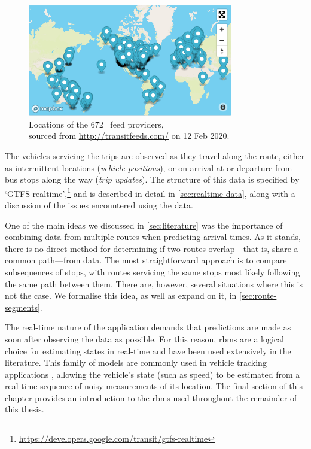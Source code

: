 \begin{figure}
\centering
\includegraphics[width=0.8\textwidth]{figure/gtfs_feeds.png}
\caption[Locations of GTFS feed providers]{Locations of the 672~\GTFS{} feed providers,\\
sourced from \url{http://transitfeeds.com/} on 12 Feb 2020.}
\label{fig:gtfs_feeds}
\end{figure}


The vehicles servicing the trips are observed as they travel along the route, either as intermittent \GPS{} locations (\emph{vehicle positions}), or on arrival at or departure from bus stops along the way (\emph{trip updates}). The structure of this data is specified by `GTFS-realtime',\footnote{\url{https://developers.google.com/transit/gtfs-realtime}} and is described in detail in \cref{sec:realtime-data}, along with a discussion of the issues encountered using the \AT{} data.


One of the main ideas we discussed in \cref{sec:literature} was the importance of combining data from multiple routes when predicting arrival times. As it stands, there is no direct method for determining if two routes overlap---that is, share a common path---from \GTFS{} data. The most straightforward approach is to compare subsequences of stops, with routes servicing the same stops most likely following the same path between them. There are, however, several situations where this is not the case. We formalise this idea, as well as expand on it, in \cref{sec:route-segments}.


The real-time nature of the application demands that predictions are made as soon after observing the data as possible. For this reason, \glspl{rbm} are a logical choice for estimating states in real-time and have been used extensively in the literature. This family of models are commonly used in vehicle tracking applications \citep{Zhao_1997,Mutambara_2000,Carpenter_1999,Wall_1999}, allowing the vehicle's state (such as speed) to be estimated from a real-time sequence of noisy measurements of its location. The final section of this chapter provides an introduction to the \glspl{rbm} used throughout the remainder of this thesis.








